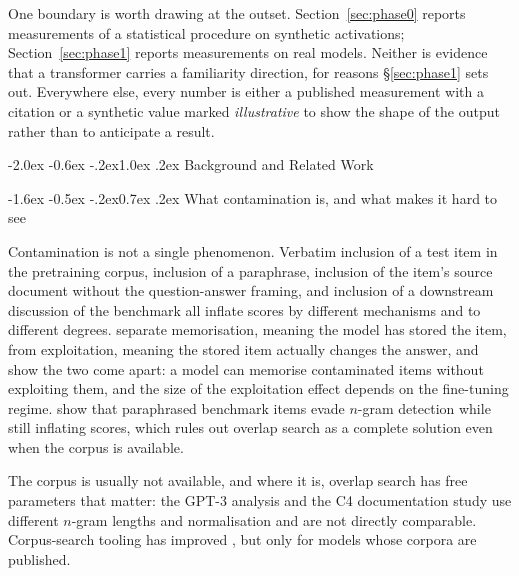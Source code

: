 \documentclass[10pt,twocolumn,letterpaper]{article}
\makeatletter
\renewcommand\section{\@startsection{section}{1}{\z@}%
  {-2.0ex \@plus -0.6ex \@minus -.2ex}{1.0ex \@plus .2ex}%
  {\normalfont\large\bfseries}}
\renewcommand\subsection{\@startsection{subsection}{2}{\z@}%
  {-1.6ex \@plus -0.5ex \@minus -.2ex}{0.7ex \@plus .2ex}%
  {\normalfont\normalsize\bfseries}}
\makeatother
\begin{document}
One boundary is worth drawing at the outset. Section~\ref{sec:phase0} reports measurements of a statistical procedure on synthetic activations; Section~\ref{sec:phase1} reports measurements on real models. Neither is evidence that a transformer carries a familiarity direction, for reasons \S\ref{sec:phase1} sets out. Everywhere else, every number is either a published measurement with a citation or a synthetic value marked \emph{illustrative} to show the shape of the output rather than to anticipate a result.

\section{Background and Related Work}

\subsection{What contamination is, and what makes it hard to see}

Contamination is not a single phenomenon. Verbatim inclusion of a test item in the pretraining corpus, inclusion of a paraphrase, inclusion of the item's source document without the question-answer framing, and inclusion of a downstream discussion of the benchmark all inflate scores by different mechanisms and to different degrees. \citet{magar2022exploitation} separate memorisation, meaning the model has stored the item, from exploitation, meaning the stored item actually changes the answer, and show the two come apart: a model can memorise contaminated items without exploiting them, and the size of the exploitation effect depends on the fine-tuning regime. \citet{yang2023rephrased} show that paraphrased benchmark items evade $n$-gram detection while still inflating scores, which rules out overlap search as a complete solution even when the corpus is available.

The corpus is usually not available, and where it is, overlap search has free parameters that matter: the GPT-3 analysis \cite{brown2020gpt3} and the C4 documentation study \cite{dodge2021documenting} use different $n$-gram lengths and normalisation and are not directly comparable. Corpus-search tooling has improved \cite{elazar2024wimbd,soldaini2024dolma}, but only for models whose corpora are published.
\end{document}
